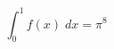 \documentclass[12pt]{article}
\begin{document}
  \[
  \int_0^1 f(x)\; dx = \pi^8
  \]
\end{document}
